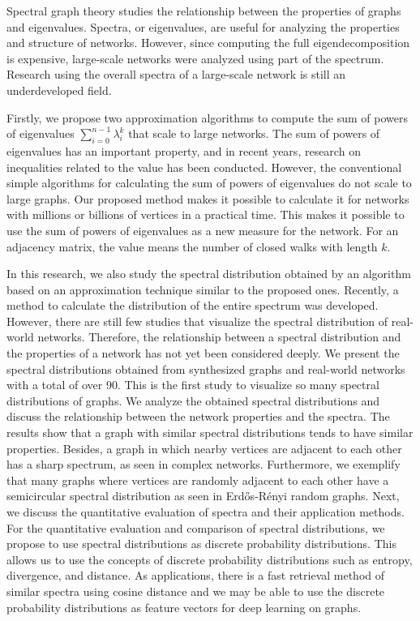 \documentclass[senior,final,11pt]{iscs-thesis}
\date{January 29, 2021}
\begin{document}
\begin{eabstract}
  Spectral graph theory studies the relationship between the properties of graphs and eigenvalues. Spectra, or eigenvalues, are useful for analyzing the properties and structure of networks. However, since computing the full eigendecomposition is expensive, large-scale networks were analyzed using part of the spectrum. Research using the overall spectra of a large-scale network is still an underdeveloped field.

  Firstly, we propose two approximation algorithms to compute the sum of powers of eigenvalues $\sum_{i=0}^{n-1} \lambda_i^k$ that scale to large networks. The sum of powers of eigenvalues has an important property, and in recent years, research on inequalities related to the value has been conducted. However, the conventional simple algorithms for calculating the sum of powers of eigenvalues do not scale to large graphs. Our proposed method makes it possible to calculate it for networks with millions or billions of vertices in a practical time. This makes it possible to use the sum of powers of eigenvalues as a new measure for the network. For an adjacency matrix, the value means the number of closed walks with length $k$.

  In this research, we also study the spectral distribution obtained by an algorithm based on an approximation technique similar to the proposed ones. Recently, a method to calculate the distribution of the entire spectrum was developed. However, there are still few studies that visualize the spectral distribution of real-world networks. Therefore, the relationship between a spectral distribution and the properties of a network has not yet been considered deeply. We present the spectral distributions obtained from synthesized graphs and real-world networks with a total of over 90. This is the first study to visualize so many spectral distributions of graphs. We analyze the obtained spectral distributions and discuss the relationship between the network properties and the spectra. The results show that a graph with similar spectral distributions tends to have similar properties. Besides, a graph in which nearby vertices are adjacent to each other has a sharp spectrum, as seen in complex networks. Furthermore, we exemplify that many graphs where vertices are randomly adjacent to each other have a semicircular spectral distribution as seen in Erdős-Rényi random graphs. Next, we discuss the quantitative evaluation of spectra and their application methods. For the quantitative evaluation and comparison of spectral distributions, we propose to use spectral distributions as discrete probability distributions. This allows us to use the concepts of discrete probability distributions such as entropy, divergence, and distance. As applications, there is a fast retrieval method of similar spectra using cosine distance and we may be able to use the discrete probability distributions as feature vectors for deep learning on graphs.



\end{eabstract}
\end{document}

